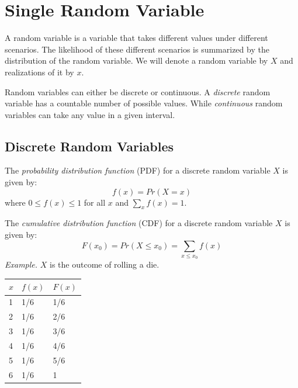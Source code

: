 \documentclass{./../../Latex/handout}
\begin{document}
\thispagestyle{plain}

\vspace{-1cm}
\section{Single Random Variable}

A random variable is a variable that takes different values under different scenarios. The likelihood of these different scenarios is summarized by the distribution of the random variable. We will denote a random variable by $X$ and realizations of it by $x$. 

Random variables can either be discrete or continuous. A \textit{discrete} random variable has a countable number of possible values. While \textit{continuous} random variables can take any value in a given interval. 

\subsection{Discrete Random Variables}

The \textit{probability distribution function} (PDF) for a discrete random variable $X$ is given by:
$$ f(x) = Pr(X=x) $$
where $0 \leq f(x) \leq 1$ for all $x$ and $\sum_x f(x) = 1$. 

The \textit{cumulative distribution function} (CDF) for a discrete random variable $X$ is given by: 
$$ F(x_0) = Pr(X \leq x_0) = \sum_{x \leq x_0} f(x) $$ 
\textit{Example.} $X$ is the outcome of rolling a die. \vspace{-0.4cm}
\begin{center}
\begin{tabularx}{0.5\textwidth}{XXX}
\toprule
$x$ & $f(x)$ & $F(x)$ \\ 
\midrule
1 & 1/6 & 1/6 \\
2 & 1/6 & 2/6 \\
3 & 1/6 & 3/6 \\
4 & 1/6 & 4/6 \\
5 & 1/6 & 5/6 \\
6 & 1/6 & 1 \\
\bottomrule
\end{tabularx}
\end{center}
\end{document}
